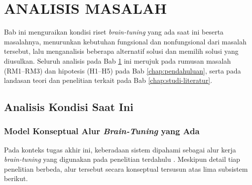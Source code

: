   \cleardoublepage %
  \chapter{ANALISIS MASALAH}
  \label{chap:analisis-masalah}

  Bab ini menguraikan kondisi riset \textit{brain-tuning} yang ada saat ini beserta masalahnya, menurunkan kebutuhan fungsional dan nonfungsional dari masalah tersebut, lalu menganalisis beberapa alternatif solusi dan memilih solusi yang diusulkan. Seluruh analisis pada Bab \ref{chap:analisis-masalah} ini merujuk pada rumusan masalah (RM1--RM3) dan hipotesis (H1--H5) pada Bab \ref{chap:pendahuluan}, serta pada landasan teori dan penelitian terkait pada Bab \ref{chap:studi-literatur}.

  \section{Analisis Kondisi Saat Ini}
  \label{chap:am_kondisi}

  \subsection{Model Konseptual Alur \textit{Brain-Tuning} yang Ada}
  \label{sub:am_konseptual}

  Pada konteks tugas akhir ini, keberadaan sistem dipahami sebagai alur kerja \textit{brain-tuning} yang digunakan pada penelitian terdahulu \autocite{schwartz2019inducing, moussa2025improving, negi2025brain, xiao2026beyond}. Meskipun detail tiap penelitian berbeda, alur tersebut secara konseptual tersusun atas lima subsistem berikut.

